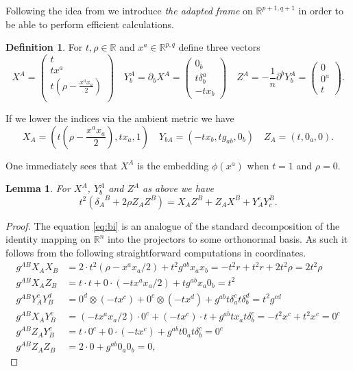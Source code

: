 \documentclass[final]{birkmult}
\newtheorem{lemma}[theorem]{Lemma}
\theoremstyle{definition}
\newtheorem{definition}[theorem]{Definition}
\theoremstyle{remark}
\numberwithin{equation}{section}
\newcommand{\R}{\mathbb{R}^{p,q}}
\newcommand{\aR}{\mathbb{R}^{p+1,q+1}}
\newcommand{\bi}[3][c]{X_{#2} Z^{#3} + Z_{#2} X^{#3} + Y_{#2}^{#1} Y^{#3}_{#1}}
\begin{document}
  Following the idea from \cite{cg} we introduce \emph{the adapted frame} on $\aR$ in order to be able to perform efficient calculations.
  \begin{definition} For $t,\rho \in \mathbb{R}$ and $x^a \in \R$ define three vectors 
  \[
  X^A = \begin{pmatrix}
	  t \\
	  tx^a \\
	  t(\rho-\frac{x^ax_a}{2}) \\
	\end{pmatrix} \quad
  Y_b^A = \partial_b X^A = \begin{pmatrix}
			      0_b \\
			      t\delta_b^a \\
			      -t x_b
			\end{pmatrix} \quad
  Z^A = - \frac{1}{n} \partial^b Y_b^A = \begin{pmatrix}
					      0 \\
					      0^a \\
					      t
				      \end{pmatrix}.
  \]
  \end{definition}
  If we lower the indices via the ambient metric we have
  \[
  X_A = (	t(\rho-\frac{x^ax_a}{2}), tx_a, 1)\quad 
  Y_{bA} =  (-tx_b, tg_{ab}, 0_b)\quad 
  Z_A = (t,0_a,0).
  \]

  One immediately sees that $X^A$ is the embedding $\phi(x^a)$ when $t=1$ and $\rho=0$. 

  \begin{lemma}For $X^A$, $Y^A_b$ and $Z^A$ as above we have
	  \begin{equation}\label{eq:bi}
	  t^2({\delta_A}^B + 2\rho Z_AZ^B)= \bi{A}{B}.
	  \end{equation}
  \end{lemma}

  \begin{proof}
    The equation \eqref{eq:bi} is an analogue of the standard decomposition of the identity mapping on $\mathbb{R}^n$ into the projectors to some orthonormal basis. As such it follows from the following straightforward computations in coordinates.
    \begin{equation} \label{dotproducts}
	  \begin{split}
	      g^{AB} X_A X_B     & = 2 \cdot t^2(\rho-x^a x_a/2) + t^2 g^{ab}x_a x_b = -t^2r + t^2r +2t^2\rho = 2t^2\rho \\
	      g^{AB} X_A Z_B     & = t \cdot t + 0 \cdot (-tx^a x_a/2) + tg^{ab}x_a 0_b = t^2 \\
	      g^{AB} Y_A^c Y_B^d & = 0^d \otimes (-tx^c) + 0^c \otimes (-tx^d) + g^{ab} t\delta_a^c t\delta_b^d = t^2g^{cd} \\
	      g^{AB} X_A Y_B^c   & = (-tx^a x_a/2)\cdot 0^c + (-tx^c)\cdot t + g^{ab}tx_a t \delta_b^c = -t^2x^c + t^2x^c = 0^c \\
	      g^{AB} Z_A Y_B^c   & = t \cdot 0^c + 0 \cdot (-tx^c) + g^{ab} t0_a t\delta_b^c = 0^c\\
	      g^{AB} Z_A Z_B     & = 2 \cdot 0 + g^{ab} 0_a 0_b = 0,
	  \end{split}
    \end{equation}
  \end{proof}
\end{document}
